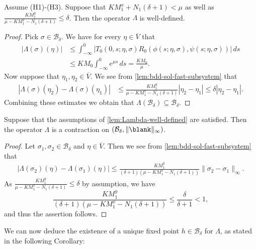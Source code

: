 \documentclass[a4paper]{siamart190516}
\begin{document}
 
 \begin{lemma}\label{lem:Lambda-well-defined}
Assume (H1)-(H3). Suppose that $K M_1^x+N_1(\delta +1) < \mu$ as well as $\frac{K M_1^y}{\mu-K M_1^x-N_1(\delta +1)}  \leq \delta$. 
Then the operator $\Lambda$ is well-defined.
 \end{lemma}
 
 \begin{proof}
Pick $\sigma \in \mathcal{B}_{\delta}$. We have for every $\eta \in \overline{V}$ that
\begin{align*}
|\Lambda(\sigma)(\eta)| &\leq \int_{-\infty}^0 | T_0(0,s;\eta,\sigma) R_0(\phi(s;\eta,\sigma),\psi(s;\eta,\sigma))| \, ds \\
&\leq K M_0 \int_{-\infty}^0 e^{\mu s} \, ds = \frac{K M_0}{\mu}.
\end{align*}
Now suppose that $\eta_1,\eta_2 \in \overline{V}$. We see from
\cref{lem:bdd-sol-fast-subsystem} that
\begin{align*}
|\Lambda(\sigma)(\eta_2) - \Lambda(\sigma)(\eta_1)| &\leq \frac{K M_1^y}{\mu-K M_1^x-N_1(\delta +1)} |\eta_2 - \eta_1| \leq \delta |\eta_2 - \eta_1|.
\end{align*} 
Combining these estimates we obtain that $\Lambda( \mathcal{B}_{\delta}) \subseteq \mathcal{B}_{\delta}$.
 \end{proof}
 
 
 \begin{lemma}\label{lem:Lambda-contraction}
Suppose that the assumptions of \cref{lem:Lambda-well-defined} are satisfied. Then
the operator $\Lambda$ is a contraction on $(\mathcal{B}_{\delta}, \| \blank
\|_{\infty})$.
 \end{lemma}
 
 \begin{proof}
Let $\sigma_1, \sigma_2 \in \mathcal{B}_{\delta}$ and $\eta \in \overline{V}$.
Then we see from \cref{lem:bdd-sol-fast-subsystem} that
\begin{align*}
| \Lambda(\sigma_2)(\eta) - \Lambda(\sigma_1)(\eta) | \leq \frac{K M_1^y}{(\delta+1)(\mu-K M_1^x-N_1(\delta +1))} \|\sigma_2 - \sigma_1\|_{\infty}.
\end{align*}
As $\frac{K M_1^y}{\mu-K M_1^x-N_1(\delta +1)} \leq \delta$ by assumption, we have
\[
\frac{K M_1^y}{(\delta+1)(\mu-K M_1^x-N_1(\delta +1))} \leq \frac{\delta}{\delta+1} < 1,
\]  
and thus the assertion follows.
 \end{proof}
 
 We can now deduce the existence of a unique fixed point $h \in \mathcal{B}_{\delta}$ for $\Lambda$, as stated in the following Corollary:
 
\end{document}
